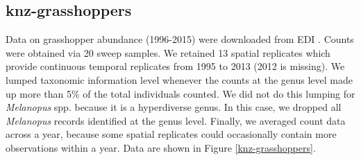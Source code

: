 \documentclass[11pt, oneside]{article}
\begin{document}
\subsection{knz-grasshoppers}
Data on grasshopper abundance (1996-2015) were downloaded from  EDI \citep{knz-grasshoppers}.
Counts were obtained via 20 sweep samples. 
We retained 13 spatial replicates which provide continuous temporal replicates from 1995 to 2013 (2012 is missing). 
We lumped taxonomic information level whenever the counts at the genus level made up more than 5$\%$ of the total individuals counted. 
We did not do this lumping for {\it Melanopus} spp. because it is a hyperdiverse genus. 
In this case, we dropped all {\it Melanopus} records identified at the genus level. 
Finally, we averaged count data across a year, because some spatial replicates could occasionally contain more observations within a year.
Data are shown in Figure \ref{knz-grasshoppers}.
\end{document}
